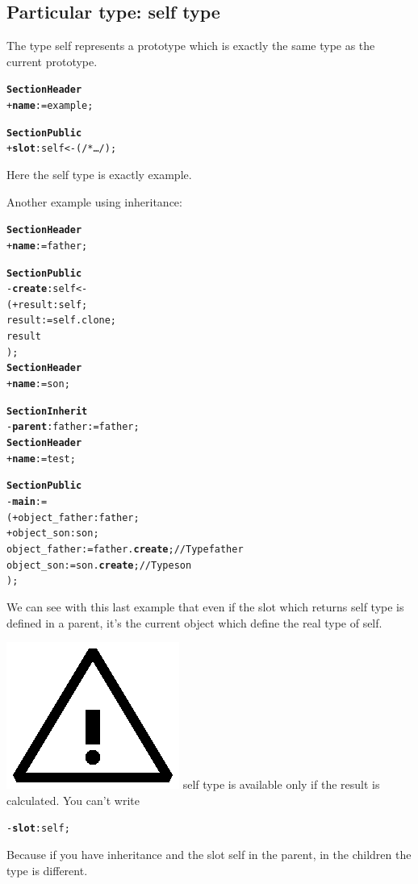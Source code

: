 \documentclass[11pt]{mybook}
\newcommand{\warning}{\includegraphics[scale=0.3]{figures/warning}}
\begin{document}
\subsection{Particular type: {\sc{}self} type}
\label{language_reference:type_names:self}
%
The type {\sc{}self} represents a prototype which is exactly 
the same type as the current prototype.

\begin{alltt}
{\bf{}Section Header}
  + {\bf{}name} := {\sc{}example};

{\bf{}Section Public}
  + {\bf{}slot}:{\sc{}self} <- ( /* \ldots */ );
\end{alltt}

Here the {\sc{}self} type is exactly {\sc{}example}.

Another example using inheritance:
\begin{alltt}
{\bf{}Section Header}
  + {\bf{}name} := {\sc{}father};

{\bf{}Section Public}
  - {\bf{}create}:{\sc{}self} <- 
  ( + result:{\sc{}self};
    result := {\sc{}self}.clone;
    result
  );\\

{\bf{}Section Header}
  + {\bf{}name} := {\sc{}son};

{\bf{}Section Inherit}
  - {\bf{}parent}:{\sc{}father} := {\sc{}father};\\

{\bf{}Section Header}
  + {\bf{}name} := {\sc{}test};

{\bf{}Section Public}
  - {\bf{}main}:=
  ( + object\_father:{\sc{}father};
    + object\_son:{\sc{}son};
    object\_father := {\sc{}father}.{\bf{}create};  // Type {\sc{}father}
    object\_son := {\sc{}son}.{\bf{}create};        // Type {\sc{}son}
  );
\end{alltt}
We can see with this last example that even if the slot which returns {\sc{}self} type is defined in a parent, it's the current object which define the real type of {\sc{}self}.

\warning{} {\sc{}self} type is available only if the result is calculated.
You can't write
\begin{alltt}
  - {\bf{}slot}:{\sc{}self};
\end{alltt}
Because if you have inheritance and the slot {\sc{}self} in the parent, in the children the type is different.
\end{document}

